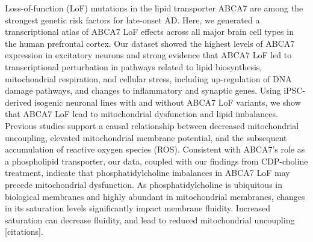 
Loss-of-function (LoF) mutations in the lipid transporter ABCA7 are among the strongest genetic risk factors for late-onset AD. Here, we generated a transcriptional atlas of ABCA7 LoF effects across all major brain cell types in the human prefrontal cortex. Our dataset showed the highest levels of ABCA7 expression in excitatory neurons and strong evidence that ABCA7 LoF led to transcriptional perturbation in pathways related to lipid biosynthesis, mitochondrial respiration, and cellular stress, including up-regulation of DNA damage pathways, and changes to inflammatory and synaptic genes. Using iPSC-derived isogenic neuronal lines with and without ABCA7 LoF variants, we show that ABCA7 LoF lead to mitochondrial dysfunction and lipid imbalances.  Previous studies support a causal relationship between decreased mitochondrial uncoupling, elevated mitochondrial membrane potential, and the subsequent accumulation of reactive oxygen species (ROS). Consistent with ABCA7's role as a phospholipid transporter, our data, coupled with our findings from CDP-choline treatment, indicate that phosphatidylcholine imbalances in ABCA7 LoF may precede mitochondrial dysfunction. As phosphatidylcholine is ubiquitous in biological membranes and highly abundant in mitochondrial membranes, changes in its saturation levels significantly impact membrane fluidity. Increased saturation can decrease fluidity, and lead to reduced mitochondrial uncoupling [citations].

